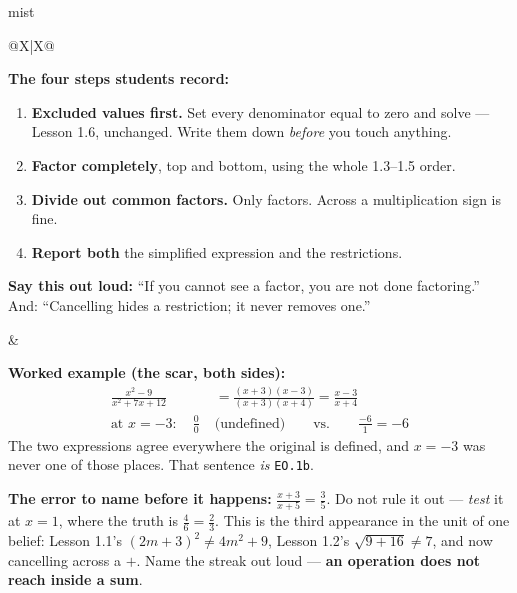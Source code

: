 \documentclass[10pt]{article}
\begin{document}
\boxguard
\begin{skillbox}{mist}
\begin{tabularx}{\linewidth}{@{}X|X@{}}
\begin{minipage}[t]{\linewidth}\vspace{0pt}
\textbf{The four steps students record:}
\begin{enumerate}[leftmargin=1.4em, itemsep=2pt, topsep=2pt]
  \item \textbf{Excluded values first.} Set every denominator equal to zero and solve --- Lesson
        1.6, unchanged. Write them down \emph{before} you touch anything.
  \item \textbf{Factor completely}, top and bottom, using the whole 1.3--1.5 order.
  \item \textbf{Divide out common factors.} Only factors. Across a multiplication sign is fine.
  \item \textbf{Report both} the simplified expression and the restrictions.
\end{enumerate}
\textbf{Say this out loud:} ``If you cannot see a factor, you are not done factoring.'' And:
``Cancelling hides a restriction; it never removes one.''
\end{minipage}
&
\begin{minipage}[t]{\linewidth}\vspace{0pt}
\textbf{Worked example (the scar, both sides):}
\[
\begin{aligned}
\frac{x^2-9}{x^2+7x+12} &= \frac{(x+3)(x-3)}{(x+3)(x+4)} = \frac{x-3}{x+4} \\
\text{at } x=-3: \quad \frac{0}{0} \; &\text{(undefined)} \qquad\text{vs.}\qquad \frac{-6}{1} = -6
\end{aligned}
\]
The two expressions agree everywhere the original is defined, and $x=-3$ was never one of those
places. That sentence \emph{is} \texttt{EO.1b}.

\textbf{The error to name before it happens:} $\frac{x+3}{x+5}=\frac35$. Do not rule it out ---
\emph{test} it at $x=1$, where the truth is $\tfrac46=\tfrac23$. This is the third appearance in
the unit of one belief: Lesson 1.1's $(2m+3)^2 \ne 4m^2+9$, Lesson 1.2's $\sqrt{9+16} \ne 7$, and
now cancelling across a $+$. Name the streak out loud --- \textbf{an operation does not reach
inside a sum}.
\end{minipage}
\end{tabularx}
\end{skillbox}
\end{document}
